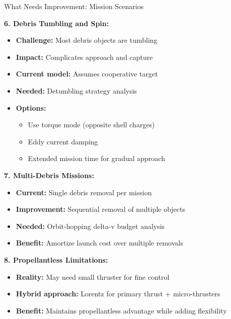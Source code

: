 \documentclass[11pt]{beamer}
\begin{document}
\begin{frame}{What Needs Improvement: Mission Scenarios}

\textbf{6. Debris Tumbling and Spin:}
\begin{itemize}
\item \textbf{Challenge:} Most debris objects are tumbling
\item \textbf{Impact:} Complicates approach and capture
\item \textbf{Current model:} Assumes cooperative target
\item \textbf{Needed:} Detumbling strategy analysis
\item \textbf{Options:}
\begin{itemize}
\item Use torque mode (opposite shell charges)
\item Eddy current damping
\item Extended mission time for gradual approach
\end{itemize}
\end{itemize}

\vspace{0.2cm}

\textbf{7. Multi-Debris Missions:}
\begin{itemize}
\item \textbf{Current:} Single debris removal per mission
\item \textbf{Improvement:} Sequential removal of multiple objects
\item \textbf{Needed:} Orbit-hopping delta-v budget analysis
\item \textbf{Benefit:} Amortize launch cost over multiple removals
\end{itemize}

\vspace{0.2cm}

\textbf{8. Propellantless Limitations:}
\begin{itemize}
\item \textbf{Reality:} May need small thruster for fine control
\item \textbf{Hybrid approach:} Lorentz for primary thrust + micro-thrusters
\item \textbf{Benefit:} Maintains propellantless advantage while adding flexibility
\end{itemize}

\end{frame}

\end{document}
